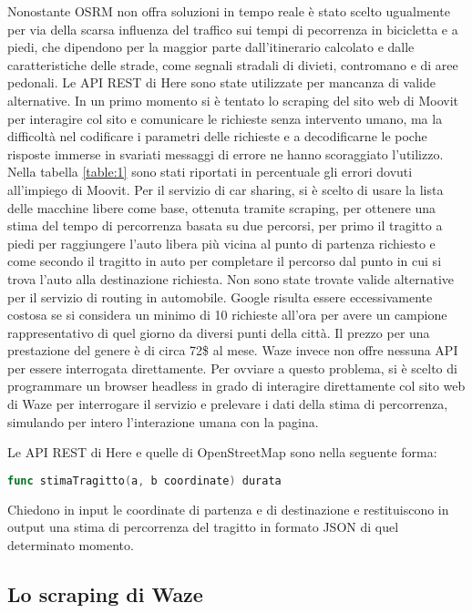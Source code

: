 Nonostante OSRM non offra soluzioni in tempo reale è stato scelto ugualmente per via della scarsa influenza del traffico sui tempi di pecorrenza in bicicletta e a piedi, che dipendono per la maggior parte dall'itinerario calcolato e dalle caratteristiche delle strade, come segnali stradali di divieti, contromano e di aree pedonali. Le API REST di Here sono state utilizzate per mancanza di valide alternative. In un primo momento si è tentato lo scraping del sito web di Moovit per interagire col sito e comunicare le richieste senza intervento umano, ma la difficoltà nel codificare i parametri delle richieste e a decodificarne le poche risposte immerse in svariati messaggi di errore ne hanno scoraggiato l'utilizzo. Nella tabella \ref{table:1} sono stati riportati in percentuale gli errori dovuti all'impiego di Moovit. Per il servizio di car sharing, si è scelto di usare la lista delle macchine libere come base, ottenuta tramite scraping, per ottenere una stima del tempo di percorrenza basata su due percorsi, per primo il tragitto a piedi per raggiungere l'auto libera più vicina al punto di partenza richiesto e come secondo il tragitto in auto per completare il percorso dal punto in cui si trova l'auto alla destinazione richiesta. Non sono state trovate valide alternative per il servizio di routing in automobile. Google risulta essere eccessivamente costosa se si considera un minimo di 10 richieste all'ora per avere un campione rappresentativo di quel giorno da diversi punti della città. Il prezzo per una prestazione del genere è di circa 72\$ al mese. Waze invece non offre nessuna API per essere interrogata direttamente. Per ovviare a questo problema, si è scelto di programmare un browser headless in grado di interagire direttamente col sito web di Waze per interrogare il servizio e prelevare i dati della stima di percorrenza, simulando per intero l'interazione umana con la pagina.

Le API REST di Here e quelle di OpenStreetMap sono nella seguente forma:

\begin{lstlisting}[language=Go]
func stimaTragitto(a, b coordinate) durata
\end{lstlisting}

Chiedono in input le coordinate di partenza e di destinazione e restituiscono in output una stima di percorrenza del tragitto in formato JSON di quel determinato momento.

\subsection{Lo scraping di Waze}

